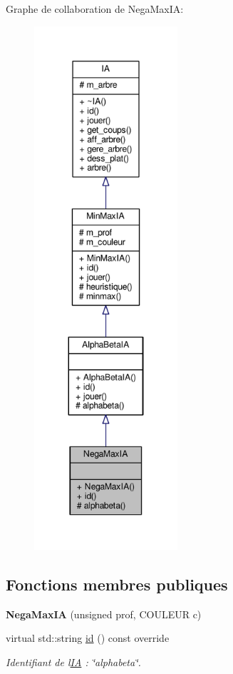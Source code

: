 Graphe de collaboration de Nega\+Max\+IA\+:\nopagebreak
\begin{figure}[H]
\begin{center}
\leavevmode
\includegraphics[height=550pt]{classNegaMaxIA__coll__graph}
\end{center}
\end{figure}
\subsection*{Fonctions membres publiques}
\begin{DoxyCompactItemize}
\item 
{\bfseries Nega\+Max\+IA} (unsigned prof, C\+O\+U\+L\+E\+UR c)\hypertarget{classNegaMaxIA_a3fd21d1bc1f35237509452d3e3ec2468}{}\label{classNegaMaxIA_a3fd21d1bc1f35237509452d3e3ec2468}

\item 
virtual std\+::string \hyperlink{classNegaMaxIA_aa8b42b9e3740f6df0d77fbf44d9062f4}{id} () const override\hypertarget{classNegaMaxIA_aa8b42b9e3740f6df0d77fbf44d9062f4}{}\label{classNegaMaxIA_aa8b42b9e3740f6df0d77fbf44d9062f4}

\begin{DoxyCompactList}\small\item\em Identifiant de l\textquotesingle{}\hyperlink{classIA}{IA} \+: \char`\"{}alphabeta\char`\"{}. \end{DoxyCompactList}\end{DoxyCompactItemize}
